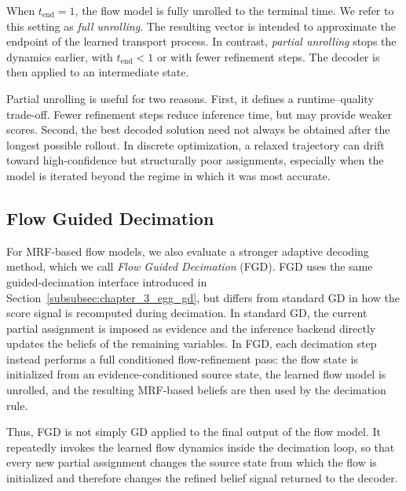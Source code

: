 When $t_{\mathrm{end}}=1$, the flow model is fully unrolled to the terminal time. We refer to this setting as \emph{full unrolling}. The resulting vector is intended to approximate the endpoint of the learned transport process. In contrast, \emph{partial unrolling} stops the dynamics earlier, with $t_{\mathrm{end}}<1$ or with fewer refinement steps. The decoder is then applied to an intermediate state.

Partial unrolling is useful for two reasons. First, it defines a runtime--quality trade-off. Fewer refinement steps reduce inference time, but may provide weaker scores. Second, the best decoded solution need not always be obtained after the longest possible rollout. In discrete optimization, a relaxed trajectory can drift toward high-confidence but structurally poor assignments, especially when the model is iterated beyond the regime in which it was most accurate. 

\subsection{Flow Guided Decimation}
\label{subsec:backend_reinference_decimation}

For MRF-based flow models, we also evaluate a stronger adaptive decoding method, which we call \emph{Flow Guided Decimation} (FGD). FGD uses the same guided-decimation interface introduced in Section~\ref{subsubsec:chapter_3_egg_gd}, but differs from standard GD in how the score signal is recomputed during decimation. In standard GD, the current partial assignment is imposed as evidence and the inference backend directly updates the beliefs of the remaining variables. In FGD, each decimation step instead performs a full conditioned flow-refinement pass: the flow state is initialized from an evidence-conditioned source state, the learned flow model is unrolled, and the resulting MRF-based beliefs are then used by the decimation rule.

Thus, FGD is not simply GD applied to the final output of the flow model. It repeatedly invokes the learned flow dynamics inside the decimation loop, so that every new partial assignment changes the source state from which the flow is initialized and therefore changes the refined belief signal returned to the decoder.


